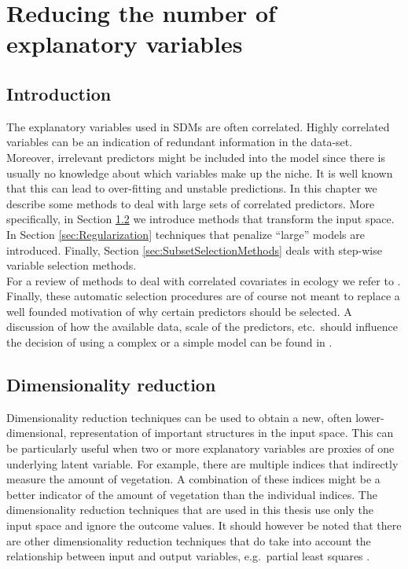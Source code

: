 \chapter{Reducing the number of explanatory variables}
\label{ch:ReducingTheNumberOfExplanatoryVariables}

\section{Introduction}
The explanatory variables used in SDMs are often correlated. Highly correlated variables can be an indication of redundant information in the data-set. Moreover, irrelevant predictors might be included into the model since there is usually no knowledge about which variables make up the niche. It is well known that this can lead to over-fitting and unstable predictions. In this chapter we describe some methods to deal with large sets of correlated predictors. More specifically, in Section \ref{sec:DimensionalityReduction} we introduce methods that transform the input space. In Section \ref{sec:Regularization} techniques that penalize ``large'' models are introduced. Finally, Section \ref{sec:SubsetSelectionMethods} deals with step-wise variable selection methods. \\

For a review of methods to deal with correlated covariates in ecology we refer to \cite{dormann_collinearity:_2013}. Finally, these automatic selection procedures are of course not meant to replace a well founded motivation of why certain predictors should be selected. A discussion of how the available data, scale of the predictors, etc.\ should influence the decision of using a complex or a simple model can be found in \cite{merow_what_2014}.

\section{Dimensionality reduction}
\label{sec:DimensionalityReduction}
Dimensionality reduction techniques can be used to obtain a new, often lower-dimensional, representation of important structures in the input space. This can be particularly useful when two or more explanatory variables are proxies of one underlying latent variable. For example, there are multiple indices that indirectly measure the amount of vegetation. A combination of these indices might be a better indicator of the amount of vegetation than the individual indices. The dimensionality reduction techniques that are used in this thesis use only the input space and ignore the outcome values. It should however be noted that there are other dimensionality reduction techniques that do take into account the relationship between input and output variables, e.g.\ partial least squares \parencite[see e.g.][]{marx_iteratively_1996}.

